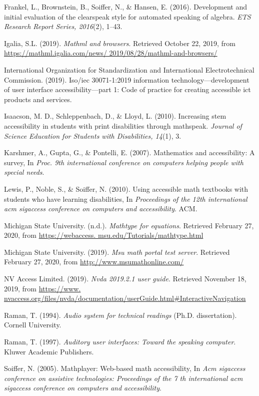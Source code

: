 \documentclass[11.5pt]{sig-alternate} %
\begin{document}
Frankel, L., Brownstein, B., Soiffer, N., \& Hansen, E. (2016). Development and initial evaluation of the clearspeak style for automated speaking of algebra. \textit{ETS Research Report Series, 2016}(2), 1–43.

Igalia, S.L. (2019). \textit{Mathml and browsers}. Retrieved October 22, 2019, from \url{https://mathml.igalia.com/news/ 2019/08/28/mathml-and-browsers/}

International Organization for Standardization and International Electrotechnical Commission. (2019). Iso/iec 30071-1:2019 information technology—development of user interface accessibility—part 1: Code of practice for creating accessible ict products and services.

Isaacson, M. D., Schleppenbach, D., \& Lloyd, L. (2010). Increasing stem accessibility in students with print disabilities through mathspeak. \textit{Journal of Science Education for Students with Disabilities, 14}(1), 3. 

Karshmer, A., Gupta, G., \& Pontelli, E. (2007). Mathematics and accessibility: A survey, In \textit{Proc. 9th international conference on computers helping people with special needs}.

Lewis, P., Noble, S., \& Soiffer, N. (2010). Using accessible math textbooks with students who have learning disabilities, In \textit{Proceedings of the 12th international acm sigaccess conference on computers and accessibility}. ACM.

Michigan State University. (n.d.). \textit{Mathtype for equations}. Retrieved February 27, 2020, from \url{https://webaccess. msu.edu/Tutorials/mathtype.html}

Michigan State University. (2019). \textit{Msu math portal test server}. Retrieved February 27, 2020, from \url{http://www.msumathonline.com/}

NV Access Limited. (2019). \textit{Nvda 2019.2.1 user guide}. Retrieved November 18, 2019, from \url{https://www. nvaccess.org/files/nvda/documentation/userGuide.html\#InteractiveNavigation}

Raman, T. (1994). \textit{Audio system for technical readings} (Ph.D. dissertation). Cornell University.

Raman, T. (1997). \textit{Auditory user interfaces: Toward the speaking computer}. Kluwer Academic Publishers. 

Soiffer, N. (2005). Mathplayer: Web-based math accessibility, In \textit{Acm sigaccess conference on assistive technologies: Proceedings of the 7 th international acm sigaccess conference on computers and accessibility}.
\end{document}
